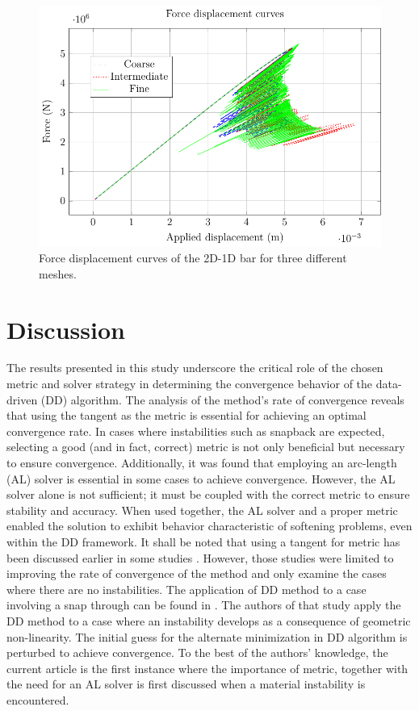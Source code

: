 \documentclass[10pt]{elsarticle}
\begin{document}
\begin{figure}[ht]
	\centering
	\includegraphics{./Images/L/force_displacement.pdf}
	\caption{Force displacement curves of the 2D-1D bar for three different meshes.}
	\label{L_force_displacement}
\end{figure}

\section{Discussion}

The results presented in this study underscore the critical role of the chosen metric and solver strategy in determining the convergence behavior of the data-driven (DD) algorithm. The analysis of the method’s rate of convergence reveals that using the tangent as the metric is essential for achieving an optimal convergence rate. In cases where instabilities such as snapback are expected, selecting a good (and in fact, correct) metric is not only beneficial but necessary to ensure convergence. Additionally, it was found that employing an arc-length (AL) solver is essential in some cases to achieve convergence. However, the AL solver alone is not sufficient; it must be coupled with the correct metric to ensure stability and accuracy. When used together, the AL solver and a proper metric enabled the solution to exhibit behavior characteristic of softening problems, even within the DD framework. It shall be noted that using a tangent for metric has been discussed earlier in some studies \cite{Pham2023,Nguyen2022,Kanno2019}. However, those studies were limited to improving the rate of convergence of the method and only examine the cases where there are no instabilities. The application of DD method to a case involving a snap through can be found in \cite{Kuang2023}. The authors of that study apply the DD method to a case where an instability develops as a consequence of geometric non-linearity. The initial guess for the alternate minimization in DD algorithm is perturbed to achieve convergence. To the best of the authors' knowledge, the current article is the first instance where the importance of metric, together with the need for an AL solver is first discussed when a material instability is encountered. 
\end{document}
